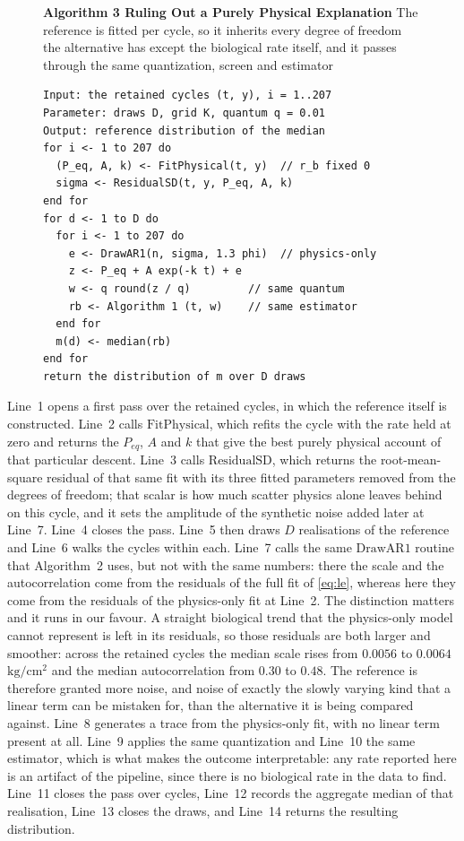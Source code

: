 \documentclass[sigconf]{acmart}
\newcommand{\pu}{\ensuremath{\mathrm{kg/cm^{2}}}}
\begin{document}
\begin{figure}[t]
\noindent\textbf{Algorithm 3  Ruling Out a Purely Physical Explanation}
The reference is fitted per cycle, so it inherits every degree of
freedom the alternative has except the biological rate itself, and it
passes through the same quantization, screen and estimator

\begin{verbatim}
Input: the retained cycles (t, y), i = 1..207
Parameter: draws D, grid K, quantum q = 0.01
Output: reference distribution of the median
for i <- 1 to 207 do
  (P_eq, A, k) <- FitPhysical(t, y)  // r_b fixed 0
  sigma <- ResidualSD(t, y, P_eq, A, k)
end for
for d <- 1 to D do
  for i <- 1 to 207 do
    e <- DrawAR1(n, sigma, 1.3 phi)  // physics-only
    z <- P_eq + A exp(-k t) + e
    w <- q round(z / q)         // same quantum
    rb <- Algorithm 1 (t, w)    // same estimator
  end for
  m(d) <- median(rb)
end for
return the distribution of m over D draws
\end{verbatim}

\end{figure}

Line~1 opens a first pass over the retained cycles, in which the
reference itself is constructed. Line~2 calls $\mathrm{FitPhysical}$,
which refits the cycle with the rate held at zero and returns the
$P_{eq}$, $A$ and $k$ that give the best purely physical account of
that particular descent. Line~3 calls $\mathrm{ResidualSD}$, which
returns the root-mean-square residual of that same fit with its three
fitted parameters removed from the degrees of freedom; that scalar is
how much scatter physics alone leaves behind on this cycle, and it
sets the amplitude of the synthetic noise added later at Line~7.
Line~4 closes the pass. Line~5 then
draws $D$ realisations of the reference and Line~6 walks the cycles
within each. Line~7 calls the same $\mathrm{DrawAR1}$ routine that
Algorithm~2 uses, but not with the same numbers: there the scale and
the autocorrelation come from the residuals of the full fit of
\eqref{eq:le}, whereas here they come from the residuals of the
physics-only fit at Line~2. The distinction matters and it runs in our
favour. A straight biological trend that the physics-only model cannot
represent is left in its residuals, so those residuals are both larger
and smoother: across the retained cycles the median scale rises from
$0.0056$ to $0.0064$~\pu{} and the median autocorrelation from $0.30$
to $0.48$. The reference is therefore granted more noise, and noise of
exactly the slowly varying kind that a linear term can be mistaken
for, than the alternative it is being compared against. Line~8
generates a trace from the physics-only fit, with no linear term
present at all. Line~9 applies the same quantization and
Line~10 the same estimator, which is what makes the outcome
interpretable: any rate reported here is an artifact of the pipeline,
since there is no biological rate in the data to find. Line~11 closes
the pass over cycles, Line~12 records the aggregate median of that
realisation, Line~13 closes the draws, and Line~14 returns the
resulting distribution.
\end{document}
